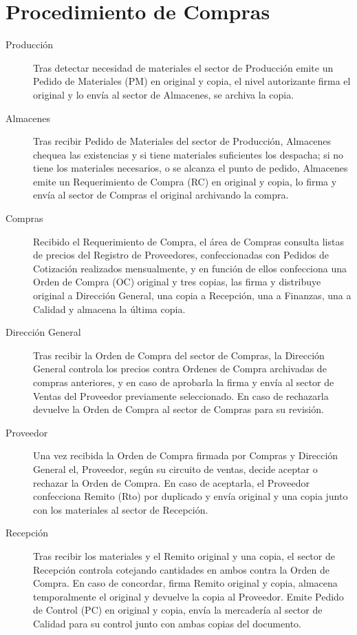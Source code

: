 \section{Procedimiento de Compras}
\begin{description}
\item[Producción] Tras detectar necesidad de materiales el sector de Producción emite un Pedido de Materiales (PM) en original y copia, el nivel autorizante firma el original y lo envía al sector de Almacenes, se archiva la copia.
\item[Almacenes] Tras recibir Pedido de Materiales del sector de Producción, Almacenes chequea las existencias y si tiene materiales suficientes los despacha; si no tiene los materiales necesarios, o se alcanza el punto de pedido, Almacenes emite un Requerimiento de Compra (RC) en original y copia, lo firma y envía al sector de Compras el original archivando la compra.
\item[Compras] Recibido el Requerimiento de Compra, el área de Compras consulta listas de precios del Registro de Proveedores, confeccionadas con Pedidos de Cotización realizados mensualmente, y en función de ellos confecciona una Orden de Compra (OC) original y tres copias, las firma y distribuye original a Dirección General, una copia a Recepción, una a Finanzas, una a Calidad y almacena la última copia.
\item [Dirección General] Tras recibir la Orden de Compra del sector de Compras, la Dirección General controla los precios contra Ordenes de Compra archivadas de compras anteriores, y en caso de aprobarla la firma y envía al sector de Ventas del Proveedor previamente seleccionado. En caso de rechazarla devuelve la Orden de Compra al sector de Compras para su revisión.
\item [Proveedor] Una vez recibida la Orden de Compra firmada por Compras y Dirección General el, Proveedor, según su circuito de ventas,  decide aceptar o rechazar la Orden de Compra. En caso de aceptarla, el Proveedor confecciona Remito (Rto) por duplicado y envía original y una copia junto con los materiales al sector de Recepción.
\item[Recepción] Tras recibir los materiales y el Remito original y una copia, el sector de Recepción controla cotejando cantidades en ambos contra la Orden de Compra. En caso de concordar, firma Remito original y copia, almacena temporalmente el original y devuelve la copia al Proveedor. Emite Pedido de Control (PC) en original y copia, envía la mercadería al sector de Calidad para su control junto con ambas copias del documento.

\end{description}
